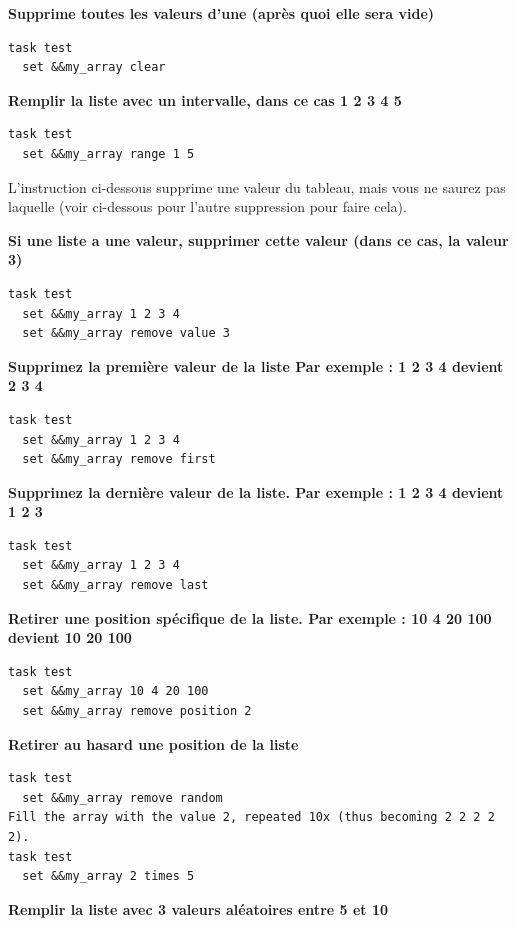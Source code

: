\documentclass[
]{book}
\begin{document}
\textbf{Supprime toutes les valeurs d'une (après quoi elle sera vide)}

\begin{verbatim}
task test
  set &&my_array clear
\end{verbatim}

\textbf{Remplir la liste avec un intervalle, dans ce cas 1 2 3 4 5}

\begin{verbatim}
task test
  set &&my_array range 1 5
\end{verbatim}

L'instruction ci-dessous supprime une valeur du tableau, mais vous ne saurez pas laquelle (voir ci-dessous pour l'autre suppression pour faire cela).

\textbf{Si une liste a une valeur, supprimer cette valeur (dans ce cas, la valeur 3)}

\begin{verbatim}
task test
  set &&my_array 1 2 3 4
  set &&my_array remove value 3
\end{verbatim}

\textbf{Supprimez la première valeur de la liste Par exemple : 1 2 3 4 devient 2 3 4}

\begin{verbatim}
task test
  set &&my_array 1 2 3 4
  set &&my_array remove first
\end{verbatim}

\textbf{Supprimez la dernière valeur de la liste. Par exemple : 1 2 3 4 devient 1 2 3}

\begin{verbatim}
task test
  set &&my_array 1 2 3 4
  set &&my_array remove last
\end{verbatim}

\textbf{Retirer une position spécifique de la liste. Par exemple : 10 4 20 100 devient 10 20 100}

\begin{verbatim}
task test
  set &&my_array 10 4 20 100
  set &&my_array remove position 2
\end{verbatim}

\textbf{Retirer au hasard une position de la liste }

\begin{verbatim}
task test
  set &&my_array remove random
Fill the array with the value 2, repeated 10x (thus becoming 2 2 2 2 2).
task test
  set &&my_array 2 times 5
\end{verbatim}

\textbf{Remplir la liste avec 3 valeurs aléatoires entre 5 et 10}
\end{document}
